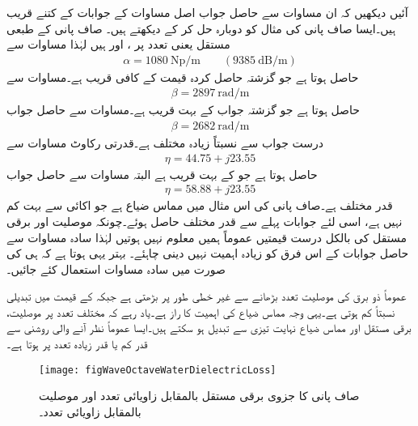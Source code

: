 آئیں دیکھیں کہ ان مساوات سے حاصل جواب اصل مساوات کے جوابات کے کتنے قریب ہیں۔ایسا صاف پانی کی مثال کو دوبارہ حل کر کے دیکھتے ہیں۔ صاف پانی کے طبعی مستقل  یعنی   تعدد پر ،  اور  ہیں لہٰذا  مساوات  سے
\begin{align*}
\alpha =\SI{1080}{\neper \per \meter} \quad \quad (\SI{9385}{\deci\bel\per\meter})
\end{align*}
حاصل ہوتا ہے جو گزشتہ حاصل کردہ قیمت  کے کافی قریب ہے۔مساوات  سے
\begin{align*}
\beta=\SI{2897}{\radian \per \meter}
\end{align*}
حاصل ہوتا ہے جو گزشتہ جواب  کے بہت قریب ہے۔مساوات  سے حاصل جواب
\begin{align*}
\beta=\SI{2682}{\radian \per \meter}
\end{align*}
درست جواب سے نسبتاً زیادہ مختلف ہے۔قدرتی رکاوٹ مساوات  سے
\begin{align*}
\eta=44.75+j 23.55
\end{align*}
حاصل ہوتا ہے جو  کے بہت قریب ہے البتہ مساوات  سے حاصل جواب
\begin{align*}
\eta=58.88+j23.55
\end{align*}
قدر مختلف ہے۔صاف پانی کی اس مثال میں مماس ضیاع  ہے جو اکائی سے بہت کم نہیں ہے، اسی لئے جوابات پہلے سے قدر مختلف حاصل ہوئے۔چونکہ موصلیت اور برقی مستقل کی بالکل درست قیمتیں عموماً ہمیں معلوم نہیں ہوتیں لہٰذا سادہ مساوات سے حاصل جوابات کے اس فرق کو زیادہ اہمیت نہیں دینی چاہئے۔ بہتر یہی ہوتا ہے کہ  ہی کی صورت میں سادہ مساوات استعمال کئے جائیں۔

عموماً ذو برق کی موصلیت تعدد بڑھانے  سے غیر خطی طور پر بڑھتی ہے جبکہ  کے قیمت میں تبدیلی نسبتاً  کم ہوتی ہے۔یہی وجہ مماس ضیاع کی اہمیت کا راز ہے۔یاد رہے کہ مختلف تعدد پر موصلیت، برقی مستقل اور مماس ضیاع نہایت تیزی سے تبدیل ہو سکتے ہیں۔ایسا عموماً نظر آنے والی روشنی سے قدر کم یا قدر زیادہ تعدد پر ہوتا ہے۔ 

\begin{figure}
\centering
\texttt{[image: figWaveOctaveWaterDielectricLoss]}
\caption{صاف پانی کا جزوی برقی مستقل بالمقابل زاویائی تعدد اور موصلیت بالمقابل زاویائی تعدد۔}
\label{شکل_موج_صاف_پانی_تعدد_بالمقابل_برقی_مستقل}
\end{figure}

